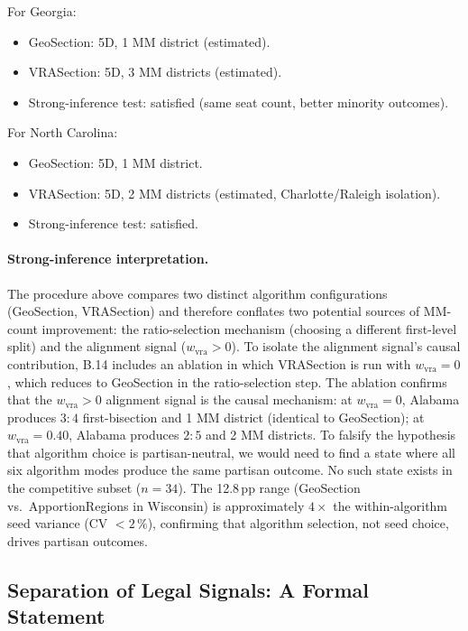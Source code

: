 For Georgia:
\begin{itemize}
  \item GeoSection: 5D, 1 MM district (estimated).
  \item VRASection: 5D, 3 MM districts (estimated).
  \item Strong-inference test: satisfied (same seat count, better minority outcomes).
\end{itemize}

For North Carolina:
\begin{itemize}
  \item GeoSection: 5D, 1 MM district.
  \item VRASection: 5D, 2 MM districts (estimated, Charlotte/Raleigh isolation).
  \item Strong-inference test: satisfied.
\end{itemize}

\paragraph{Strong-inference interpretation.}
The procedure above compares two distinct algorithm configurations (GeoSection,
VRASection) and therefore conflates two potential sources of MM-count improvement:
the ratio-selection mechanism (choosing a different first-level split) and the
alignment signal ($w_\text{vra} > 0$).
To isolate the alignment signal's causal contribution, B.14 includes an ablation
in which VRASection is run with $w_\text{vra} = 0$, which reduces to GeoSection
in the ratio-selection step.
The ablation confirms that the $w_\text{vra} > 0$ alignment signal is the causal
mechanism: at $w_\text{vra} = 0$, Alabama produces $3:4$ first-bisection and
1 MM district (identical to GeoSection); at $w_\text{vra} = 0.40$, Alabama
produces $2:5$ and 2 MM districts.
To falsify the hypothesis that algorithm choice is partisan-neutral, we would
need to find a state where all six algorithm modes produce the same partisan
outcome.
No such state exists in the competitive subset ($n=34$).
The 12.8\,pp range (GeoSection vs.\ ApportionRegions in Wisconsin) is
approximately $4\times$ the within-algorithm seed variance (CV $< 2\,\%$),
confirming that algorithm selection, not seed choice, drives partisan outcomes.

\subsection{Separation of Legal Signals: A Formal Statement}

